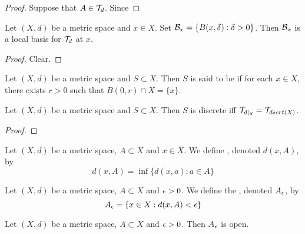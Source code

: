 \documentclass{book}
\begin{document}
	\begin{proof}
		Suppose that $A \in \mathcal{T}_d$. Since 
	\end{proof}

	\begin{ex} 
		Let $(X,d)$ be a metric space and $x \in X$. Set $\mathcal{B}_x = \{B(x, \delta): \delta > 0\}$. Then $\mathcal{B}_x$ is a local basis for $\mathcal{T}_d$ at $x$. \\
	\end{ex}	
	
	\begin{proof}
		Clear.
	\end{proof}



\begin{defn}
	Let $(X,d)$ be a metric space and $S \subset X$. Then $S$ is said to be  if for each $x \in X$, there exists $r > 0$ such that $B(0, r) \cap X = \{x\}$. 
\end{defn}

\begin{ex}
	Let $(X, d)$ be a metric space and $S \subset X$. Then $S$ is discrete iff $\mathcal{T}_{d|_S} = \mathcal{T}_{dscrt(X)}$.   
\end{ex}

\begin{proof}
\end{proof}

\begin{defn}
	Let $(X, d)$ be a metric space, $A \subset X$ and $x \in X$. We define , denoted $d(x, A)$, by 
	$$d(x, A) = \inf \{d(x, a): a \in A\}$$
\end{defn}

\begin{defn}
	Let $(X, d)$ be a metric space, $A \subset X$ and $\epsilon >0$. We define the , denoted $A_{\epsilon}$, by 
	$$A_{\epsilon} = \{x \in X: d(x, A) < \epsilon\}$$ 
\end{defn}

\begin{ex}
	Let $(X, d)$ be a metric space, $A \subset X$ and $\epsilon >0$. Then $A_{\epsilon}$ is open. 
\end{ex}
\end{document}
